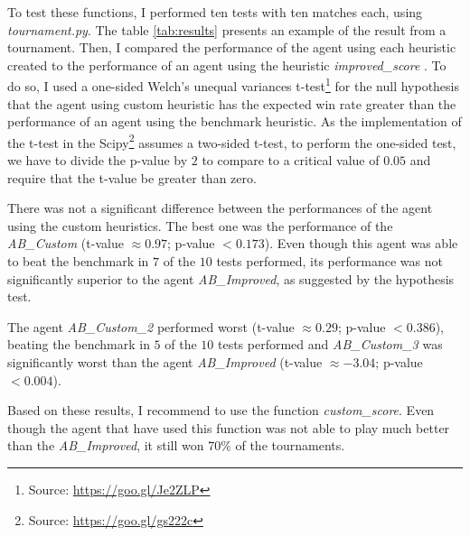 \documentclass[a4paper]{article}
\begin{document}
To test these functions, I performed ten tests with ten matches each, using \textit{tournament.py}. The table \ref{tab:results} presents an example of the result from a tournament. Then, I compared the performance of the agent using each heuristic created to the performance of an agent using the heuristic \textit{improved\_score} . To do so, I used a one-sided Welch's unequal variances t-test\footnote{Source: \url{https://goo.gl/Je2ZLP}} for the null hypothesis that the agent using custom heuristic has the expected win rate greater than the performance of an agent using the benchmark heuristic. As the implementation of the t-test in the Scipy\footnote{Source: \url{https://goo.gl/gs222c}} assumes a two-sided t-test, to perform the one-sided test, we have to divide the p-value by $2$ to compare to a critical value of $0.05$ and require that the t-value be greater than zero.



There was not a significant difference between the performances of the agent using the custom heuristics. The best one was the performance of the \textit{AB\_Custom} (t-value $\approx 0.97$;  p-value $< 0.173$). Even though this agent was able to beat the benchmark in $7$ of the $10$ tests performed, its performance was not significantly superior to the agent \textit{AB\_Improved}, as suggested by the hypothesis test.

The agent \textit{AB\_Custom\_2} performed worst (t-value $\approx 0.29$;  p-value $< 0.386$), beating the benchmark in $5$ of the $10$ tests performed and \textit{AB\_Custom\_3} was significantly worst than the agent \textit{AB\_Improved} (t-value $\approx -3.04$;  p-value $< 0.004$).

Based on these results, I recommend to use the function \textit{custom\_score}. Even though the agent that have used this function was not able to play much better than the \textit{AB\_Improved}, it still won 70\% of the tournaments.
\end{document}
